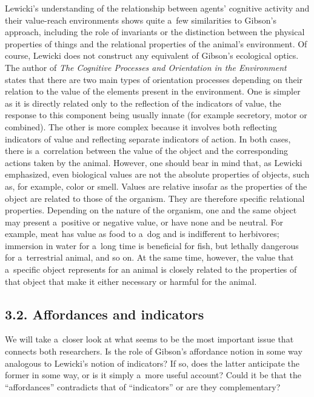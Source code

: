 Lewicki's understanding of the relationship between agents' cognitive activity and their value-reach environments shows quite a~few similarities to Gibson's approach, including the role of invariants or the distinction between the physical properties of things and the relational properties of the animal's environment. Of course, Lewicki does not construct any equivalent of Gibson's ecological optics. The author of \textit{The Cognitive Processes and Orientation in the Environment} states that there are two main types of orientation processes depending on their relation to the value of the elements present in the environment. One is simpler as it is directly related only to the reflection of the indicators of value, the response to this component being usually innate (for example secretory, motor or combined). The other is more complex because it involves both reflecting indicators of value and reflecting separate indicators of action. In both cases, there is a~correlation between the value of the object and the corresponding actions taken by the animal. However, one should bear in mind that, as Lewicki emphasized, even biological values are not the absolute properties of objects, such as, for example, color or smell. Values are relative insofar as the properties of the object are related to those of the organism. They are therefore specific relational properties. Depending on the nature of the organism, one and the same object may present a~positive or negative value, or have none and be neutral. For example, meat has value as food to a~dog and is indifferent to herbivores; immersion in water for a~long time is beneficial for fish, but lethally dangerous for a~terrestrial animal, and so on. At the same time, however, the value that a~specific object represents for an animal is closely related to the properties of that object that make it either necessary or harmful for the animal.



\subsection*{3.2. Affordances and indicators}



We will take a~closer look at what seems to be the most important issue that connects both researchers. Is the role of Gibson's affordance notion in some way analogous to Lewicki's notion of indicators? If so, does the latter anticipate the former in some way, or is it simply a~more useful account? Could it be that the ``affordances'' contradicts that of ``indicators'' or are they complementary?



